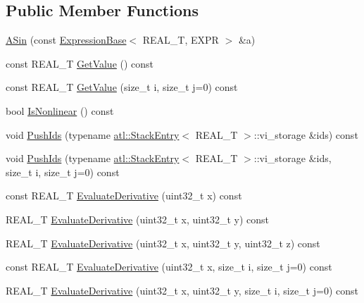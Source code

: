 \subsection*{Public Member Functions}
\begin{DoxyCompactItemize}
\item 
\hyperlink{structatl_1_1_a_sin_a78dd6e912643cfb931c91b0cdcd86775}{A\+Sin} (const \hyperlink{structatl_1_1_expression_base}{Expression\+Base}$<$ R\+E\+A\+L\+\_\+\+T, E\+X\+P\+R $>$ \&a)
\item 
const R\+E\+A\+L\+\_\+\+T \hyperlink{structatl_1_1_a_sin_a735c2c1455ac56357b45891d6e1e89e9}{Get\+Value} () const 
\item 
const R\+E\+A\+L\+\_\+\+T \hyperlink{structatl_1_1_a_sin_a3495a8c2cfae3128fb661f70d4a81f66}{Get\+Value} (size\+\_\+t i, size\+\_\+t j=0) const 
\item 
bool \hyperlink{structatl_1_1_a_sin_aed481e77dce3a87099dcdabbba02ec9c}{Is\+Nonlinear} () const 
\item 
void \hyperlink{structatl_1_1_a_sin_a9ce7699eb3a349c5aef84ae5b300571e}{Push\+Ids} (typename \hyperlink{structatl_1_1_stack_entry}{atl\+::\+Stack\+Entry}$<$ R\+E\+A\+L\+\_\+\+T $>$\+::vi\+\_\+storage \&ids) const 
\item 
void \hyperlink{structatl_1_1_a_sin_a87876d1ff74017c2db8fb4f83dc6f812}{Push\+Ids} (typename \hyperlink{structatl_1_1_stack_entry}{atl\+::\+Stack\+Entry}$<$ R\+E\+A\+L\+\_\+\+T $>$\+::vi\+\_\+storage \&ids, size\+\_\+t i, size\+\_\+t j=0) const 
\item 
const R\+E\+A\+L\+\_\+\+T \hyperlink{structatl_1_1_a_sin_a280bb07b162a39a6007bd2babd7b068c}{Evaluate\+Derivative} (uint32\+\_\+t x) const 
\item 
R\+E\+A\+L\+\_\+\+T \hyperlink{structatl_1_1_a_sin_ac66a19f09203233fcbce5940d7b3ea09}{Evaluate\+Derivative} (uint32\+\_\+t x, uint32\+\_\+t y) const 
\item 
R\+E\+A\+L\+\_\+\+T \hyperlink{structatl_1_1_a_sin_a2515923288ec66684e1590efcaaa34e6}{Evaluate\+Derivative} (uint32\+\_\+t x, uint32\+\_\+t y, uint32\+\_\+t z) const 
\item 
const R\+E\+A\+L\+\_\+\+T \hyperlink{structatl_1_1_a_sin_accb124b6b3142902322b2c1c35ead579}{Evaluate\+Derivative} (uint32\+\_\+t x, size\+\_\+t i, size\+\_\+t j=0) const 
\item 
R\+E\+A\+L\+\_\+\+T \hyperlink{structatl_1_1_a_sin_a4e0b56394333abdb3b9f227cf22f56cf}{Evaluate\+Derivative} (uint32\+\_\+t x, uint32\+\_\+t y, size\+\_\+t i, size\+\_\+t j=0) const 
\item 

\end{DoxyCompactItemize}
